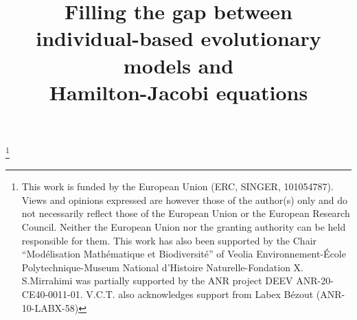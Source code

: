 \documentclass[JEP,XML,SOM,Unicode,published]{cedram}
\theoremstyle{plain}
\theoremstyle{remark}
\begin{document}
\title[Individual-based evolutionary models and Hamilton-Jacobi equations]{Filling the gap between\\ individual-based evolutionary models and\\ Hamilton-Jacobi equations}

\author[\initial{N.} \lastname{Champagnat}]{ }
\address{Université de Lorraine, CNRS, Inria, IECL\\
F-54000 Nancy, France}

\author[\initial{S.} \lastname{Méléard}]{ }
\address{École Polytechnique \& Institut Universitaire de France, CNRS, Institut polytechnique de Paris\\
route de Saclay, 91128 Palaiseau Cedex, France}

\author[\initial{S.} \lastname{Mirrahimi}]{\nobreakauthor {}}
\address{Institut Montpelliérain Alexander Grothendieck, Univ. Montpellier, CNRS\\
Place Eugène Bataillon, 34090 Montpellier, France}

\author[\initial{V. T.} \lastname{Tran}]{ }
\address{LAMA, Univ Gustave Eiffel, Univ Paris Est Creteil, CNRS\\
F-77454 Marne-la-Vallée, France}

\thanks{This work is funded by the European Union (ERC, SINGER, 101054787). Views and opinions expressed are however those of the author(s) only and do not necessarily reflect those of the European Union or the European Research Council. Neither the European Union nor the granting authority can be held responsible for them. This work has also been supported by the Chair ``Modélisation Mathématique et Biodiversité'' of Veolia Environnement-École Polytechnique-Museum National d’Histoire Naturelle-Fondation X. S.Mirrahimi was partially supported by the ANR project DEEV ANR-20-CE40-0011-01. V.C.T. also acknowledges support from Labex Bézout (ANR-10-LABX-58)}
\end{document}
